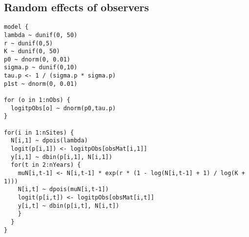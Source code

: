 \documentclass[12pt]{article}
\begin{document}
%
%
%
%

\subsection{Random effects of observers}
\begin{verbatim}
model {
lambda ~ dunif(0, 50)
r ~ dunif(0,5)
K ~ dunif(0, 50)
p0 ~ dnorm(0, 0.01)
sigma.p ~ dunif(0,10)
tau.p <- 1 / (sigma.p * sigma.p)
p1st ~ dnorm(0, 0.01)

for (o in 1:nObs) {
  logitpObs[o] ~ dnorm(p0,tau.p)
}

for(i in 1:nSites) {
  N[i,1] ~ dpois(lambda)
  logit(p[i,1]) <- logitpObs[obsMat[i,1]] 
  y[i,1] ~ dbin(p[i,1], N[i,1])
  for(t in 2:nYears) {
    muN[i,t-1] <- N[i,t-1] * exp(r * (1 - log(N[i,t-1] + 1) / log(K + 1)))
    N[i,t] ~ dpois(muN[i,t-1])
    logit(p[i,t]) <- logitpObs[obsMat[i,t]] 
    y[i,t] ~ dbin(p[i,t], N[i,t])
    }
  }
}
\end{verbatim}
\end{document}
